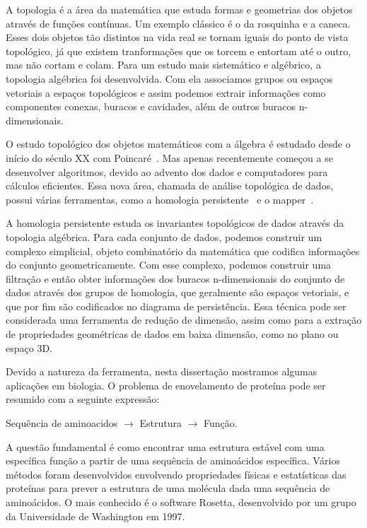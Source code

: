 A topologia é a área da matemática que estuda formas e geometrias 
dos objetos através de funções contínuas. Um exemplo clássico 
é o da rosquinha e a caneca. Esses dois objetos tão distintos na vida
real se tornam iguais do ponto de vista topológico, já que existem 
tranformações que os torcem e entortam até o outro,
mas não cortam e colam. Para um estudo mais sistemático e algébrico,
a topologia algébrica foi desenvolvida. Com ela associamos
grupos ou espaços vetoriais a espaços topológicos e assim podemos extrair
informações como componentes conexas, buracos e cavidades, além
de outros buracos n-dimensionais. 

O estudo topológico dos objetos matemáticos com a álgebra é estudado 
desde o início do século XX com Poincaré~\cite{Poincare1895}. Mas 
apenas recentemente começou a se desenvolver algoritmos, devido ao
advento dos dados e computadores para cálculos eficientes. 
Essa nova área, chamada de análise topológica de dados, possui 
várias ferramentas, como a homologia persistente~\cite{edelsbrunner2010computational}
e o mapper~\cite{mapper}. 

A homologia persistente estuda os invariantes topológicos de dados 
através da topologia algébrica. Para cada conjunto de dados,
podemos construir um complexo simplicial, objeto combinatório da 
matemática que codifica informações do conjunto geometricamente. Com esse complexo,
podemos construir uma filtração e então obter informações
dos buracos n-dimensionais do conjunto de dados através dos
grupos de homologia, que geralmente são espaços vetoriais, e que por fim
são codificados no diagrama de persistência. Essa técnica
pode ser considerada uma ferramenta de redução de dimensão, assim como
para a extração de propriedades geométricas
de dados em baixa dimensão, como no plano ou espaço 3D.

Devido a natureza da ferramenta, nesta dissertação mostramos algumas
aplicações em biologia. O problema de enovelamento de proteína
pode ser resumido com a seguinte expressão:
\begin{center}
    Sequência de aminoacidos $\rightarrow$ Estrutura $\rightarrow$ Função.
\end{center}
A questão fundamental é como encontrar uma estrutura estável com uma específica
função a partir de uma sequência de aminoácidos específica.\cite{Dill2008}
Vários métodos foram desenvolvidos envolvendo propriedades físicas e estatísticas
das proteínas para prever a estrutura de uma molécula dada uma sequência de aminoácidos.
O mais conhecido é o software Rosetta, desenvolvido por um grupo da Universidade 
de Washington em 1997.\cite{Simons1997}

